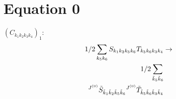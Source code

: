 \documentclass[11pt]{article}
\begin{document}
\section{Equation 0}
$\left({C}_{{k}_{1}{k}_{2}{k}_{3}{k}_{4}}\right)_{1}$:
\begin{align}
1/2\sum_{{k}_{5}{k}_{6}}{S}_{{k}_{1}{k}_{2}{k}_{5}{k}_{6}}{T}_{{k}_{5}{k}_{6}{k}_{3}{k}_{4}}&\rightarrow \notag \\1/2\sum_{\tilde{k}_{5}\tilde{k}_{6}}& \notag \\{}^{J^{(0)}}\tilde{S}_{\tilde{k}_{1}\tilde{k}_{2}\tilde{k}_{5}\tilde{k}_{6}}{}^{J^{(0)}}\tilde{T}_{\tilde{k}_{5}\tilde{k}_{6}\tilde{k}_{3}\tilde{k}_{4}}& \notag \\
\end{align}
\end{document}
